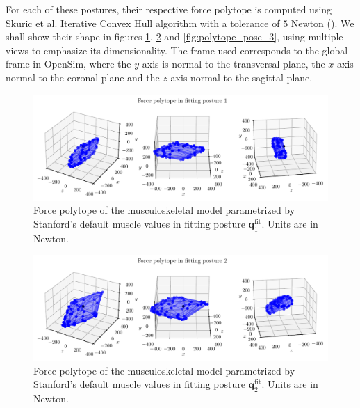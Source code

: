 For each of these postures, their respective force polytope is computed using Skuric et al. Iterative Convex Hull algorithm with a tolerance of $5$ Newton (\cite{skuricOnLineFeasibleWrench2022}). We shall show their shape in figures \ref{fig:polytope_pose_1}, \ref{fig:polytope_pose_2} and \ref{fig:polytope_pose_3}, using multiple views to emphasize its dimensionality. The frame used corresponds to the global frame in OpenSim, where the $y$-axis is normal to the transversal plane, the $x$-axis normal to the coronal plane and the $z$-axis normal to the sagittal plane.

\clearpage
\begin{figure}[!htb]
    \centering
    \captionsetup{justification=centering}
    \begin{minipage}{\linewidth}
        \centering
        \includegraphics[trim={0 0 0 0}, clip, width=1\linewidth]{img/chapter_4/reconstruction_stanford_imgs/STANFORD_POSTURE_FITTING_01.pdf}
    \end{minipage}
    \caption{Force polytope of the musculoskeletal model parametrized by Stanford's default muscle values in fitting posture $\mathbf{q}_1^{\text{fit}}$. Units are in Newton.}
    \label{fig:polytope_pose_1}
\end{figure}

\begin{figure}[!htb]
    \centering
    \captionsetup{justification=centering}
    \begin{minipage}{\linewidth}
        \centering
        \includegraphics[trim={0 0 0 0}, clip, width=1\linewidth]{img/chapter_4/reconstruction_stanford_imgs/STANFORD_POSTURE_FITTING_02.pdf}
    \end{minipage}
    \caption{Force polytope of the musculoskeletal model parametrized by Stanford's default muscle values in fitting posture $\mathbf{q}_2^{\text{fit}}$. Units are in Newton.}
    \label{fig:polytope_pose_2}
\end{figure}

